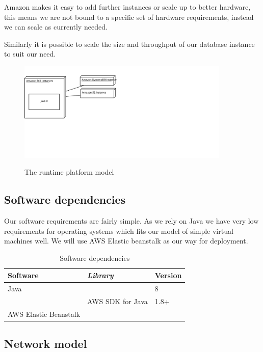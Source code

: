 Amazon makes it easy to add further instances or scale up to better hardware,
this means we are not bound to a specific set of hardware requirements, instead
we can scale as currently needed.

Similarly it is possible to scale the size and throughput of our database
instance to suit our need.

\begin{figure}[h!]
  \centering
  \includegraphics[width=0.9\textwidth]{figures/runtime-platform-model}
  \label{fig:runtime-platform-model}
  \caption{The runtime platform model}
\end{figure}


\subsection{Software dependencies}
\label{sec:softw-depend}
Our software requirements are fairly simple.
As we rely on Java we have very low requirements for operating systems which
fits our model of simple virtual machines well.
We will use AWS Elastic beanstalk as our way for deployment.

\begin{table}[h!]
  \centering
  \begin{tabular}[h]{l|l|l}
    Software & \textit{Library}  & Version \\
    \hline
    Java & & 8 \\
    & AWS SDK for Java & 1.8+ \\
    AWS Elastic Beanstalk & & \\
  \end{tabular}
  \caption{Software dependencies}
  \label{tab:software-dependencies}
\end{table}
\subsection{Network model}
\label{sec:network-model}

